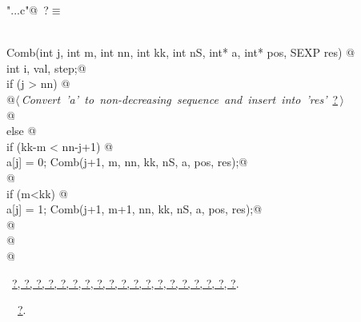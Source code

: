 \documentclass[reqno]{amsart}
\renewcommand{\NWtarget}[2]{\hypertarget{#1}{#2}}
\renewcommand{\NWlink}[2]{\hyperlink{#1}{#2}}
\begin{document}
\begin{flushleft} \small\label{scrap12}\raggedright\small
\NWtarget{nuweb?}{} \verb@"..\src\ReprodCalcs.c"@\nobreak\ {\footnotesize {?}}$\equiv$
\vspace{-1ex}
\begin{list}{}{} \item
\mbox{}\verb@@\\
\mbox{}\verb@void Comb(int j, int m, int nn, int kk, int nS, int* a, int* pos, SEXP res) {@\\
\mbox{}\verb@        int i, val, step;@\\
\mbox{}\verb@        if (j > nn) {  @\\
\mbox{}\verb@        @\hbox{$\langle\,${\itshape Convert 'a' to non-decreasing sequence and insert into 'res'}\nobreak\ {\footnotesize \NWlink{nuweb?}{?}}$\,\rangle$}\verb@@\\
\mbox{}\verb@    }           @\\
\mbox{}\verb@        else {@\\
\mbox{}\verb@                if (kk-m < nn-j+1) {@\\
\mbox{}\verb@                        a[j] = 0; Comb(j+1, m, nn, kk, nS, a, pos, res);@\\
\mbox{}\verb@                }@\\
\mbox{}\verb@                if (m<kk) {@\\
\mbox{}\verb@                        a[j] = 1; Comb(j+1, m+1, nn, kk, nS, a, pos, res);@\\
\mbox{}\verb@                }@\\
\mbox{}\verb@        }@\\
\mbox{}\verb@}@\\
\mbox{}\verb@@{\NWsep}
\end{list}
\vspace{-1.5ex}
\footnotesize
\begin{list}{}{\setlength{\itemsep}{-\parsep}\setlength{\itemindent}{-\leftmargin}}
\item \NWtxtFileDefBy\ \NWlink{nuweb?}{?}\NWlink{nuweb?}{, ?}\NWlink{nuweb?}{, ?}\NWlink{nuweb?}{, ?}\NWlink{nuweb?}{, ?}\NWlink{nuweb?}{, ?}\NWlink{nuweb?}{, ?}\NWlink{nuweb?}{, ?}\NWlink{nuweb?}{, ?}\NWlink{nuweb?}{, ?}\NWlink{nuweb?}{, ?}\NWlink{nuweb?}{, ?}\NWlink{nuweb?}{, ?}\NWlink{nuweb?}{, ?}\NWlink{nuweb?}{, ?}\NWlink{nuweb?}{, ?}\NWlink{nuweb?}{, ?}\NWlink{nuweb?}{, ?}\NWlink{nuweb?}{, ?}.
\item \NWtxtIdentsDefed\nobreak\  \verb@Comb@\nobreak\ \NWlink{nuweb?}{?}.
\item{}
\end{list}
\vspace{4ex}
\end{flushleft}
\end{document}

